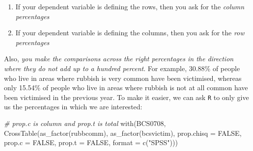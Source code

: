 \documentclass[
]{book}
\newenvironment{Shaded}{\begin{snugshade}}{\end{snugshade}}
\newcommand{\AttributeTok}[1]{\textcolor[rgb]{0.77,0.63,0.00}{#1}}
\newcommand{\CommentTok}[1]{\textcolor[rgb]{0.56,0.35,0.01}{\textit{#1}}}
\newcommand{\ConstantTok}[1]{\textcolor[rgb]{0.00,0.00,0.00}{#1}}
\newcommand{\FunctionTok}[1]{\textcolor[rgb]{0.00,0.00,0.00}{#1}}
\newcommand{\NormalTok}[1]{#1}
\newcommand{\StringTok}[1]{\textcolor[rgb]{0.31,0.60,0.02}{#1}}
\begin{document}
\begin{enumerate}
\def\labelenumi{\arabic{enumi}.}
\item
  If your dependent variable is defining the rows, then you ask for the \emph{column percentages}
\item
  If your dependent variable is defining the columns, then you ask for the \emph{row percentages}
\end{enumerate}

Also, \emph{you make the comparisons across the right percentages in the direction where they do not add up to a hundred percent}. For example, 30.88\% of people who live in areas where rubbish is very common have been victimised, whereas only 15.54\% of people who live in areas where rubbish is not at all common have been victimised in the previous year. To make it easier, we can ask \texttt{R} to only give us the percentages in which we are interested:

\begin{Shaded}
\begin{Highlighting}[]
\CommentTok{\# prop.c is column and prop.t is total}
\FunctionTok{with}\NormalTok{(BCS0708, }\FunctionTok{CrossTable}\NormalTok{(}\FunctionTok{as\_factor}\NormalTok{(rubbcomm), }
                         \FunctionTok{as\_factor}\NormalTok{(bcsvictim), }
                         \AttributeTok{prop.chisq =} \ConstantTok{FALSE}\NormalTok{, }\AttributeTok{prop.c =} \ConstantTok{FALSE}\NormalTok{, }\AttributeTok{prop.t =} \ConstantTok{FALSE}\NormalTok{, }\AttributeTok{format =}
                           \FunctionTok{c}\NormalTok{(}\StringTok{"SPSS"}\NormalTok{)))}
\end{Highlighting}
\end{Shaded}
\end{document}
